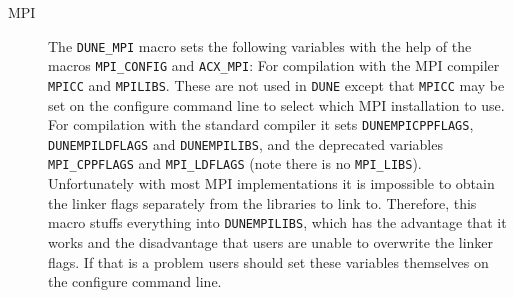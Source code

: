\documentclass[11pt,a4paper,headinclude,footinclude,DIV16,normalheadings]{scrartcl}
\newcommand{\dune}{\texttt{DUNE}\xspace}
\begin{document}
\begin{description}
\item[MPI] The \texttt{DUNE\_MPI} macro sets the following variables with the
  help of the macros \texttt{MPI\_CONFIG} and \texttt{ACX\_MPI}: For
  compilation with the MPI compiler \texttt{MPICC} and \texttt{MPILIBS}.
  These are not used in \dune except that \texttt{MPICC} may be set on the
  configure command line to select which MPI installation to use.  For
  compilation with the standard compiler it sets \texttt{DUNEMPICPPFLAGS},
  \texttt{DUNEMPILDFLAGS} and \texttt{DUNEMPILIBS}, and the deprecated
  variables \texttt{MPI\_CPPFLAGS} and \texttt{MPI\_LDFLAGS} (note there is no
  \texttt{MPI\_LIBS}).  Unfortunately with most MPI implementations it is
  impossible to obtain the linker flags separately from the libraries to link
  to.  Therefore, this macro stuffs everything into \texttt{DUNEMPILIBS},
  which has the advantage that it works and the disadvantage that users are
  unable to overwrite the linker flags.  If that is a problem users should set
  these variables themselves on the configure command line.


\end{description}
\end{document}
